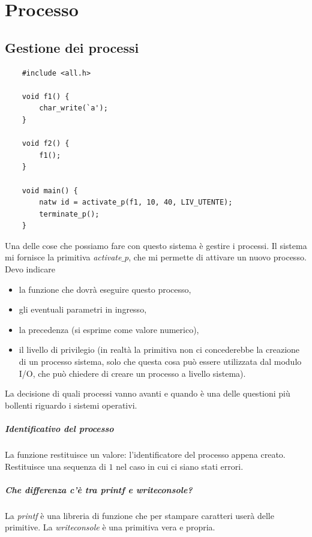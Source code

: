 \chapter{Processo}

\section{Gestione dei processi}
\small
\begin{verbatim}
	#include <all.h>
	
	void f1() {
		char_write(`a');
	}
	
	void f2() {
		f1();
	}
	
	void main() {
		natw id = activate_p(f1, 10, 40, LIV_UTENTE);
		terminate_p();
	}
\end{verbatim}
\normalsize
Una delle cose che possiamo fare con questo sistema è gestire i processi.  Il sistema mi fornisce la primitiva \emph{activate$\_$p}, che mi permette di attivare un nuovo processo. Devo indicare
\begin{itemize}
	\item la funzione che dovrà eseguire questo processo,
	\item gli eventuali parametri in ingresso,
	\item la precedenza (si esprime come valore numerico),
	\item il livello di privilegio (in realtà la primitiva non ci concederebbe la creazione di un processo sistema, solo che questa cosa può essere utilizzata dal modulo I/O, che può chiedere di creare un processo a livello sistema).
\end{itemize}
La decisione di quali processi vanno avanti e quando è una delle questioni più bollenti riguardo i sistemi operativi. 
\paragraph{Identificativo del processo} La funzione restituisce un valore: l'identificatore del processo appena creato. Restituisce una sequenza di $1$ nel caso in cui ci siano stati errori.

\paragraph{Che differenza c'è tra \emph{printf} e \emph{writeconsole}?} La \emph{printf} è una libreria di funzione che per stampare caratteri userà delle primitive. La \emph{writeconsole} è una primitiva vera e propria.

